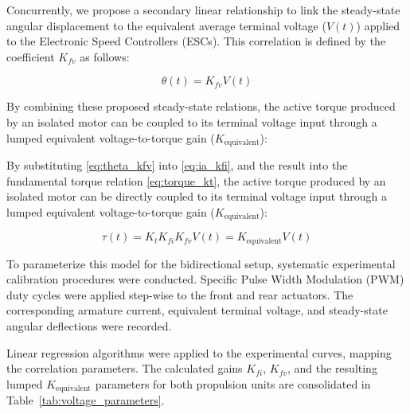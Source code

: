 \documentclass[pdflatex,sn-mathphys-num,iicol]{sn-jnl}
\theoremstyle{thmstyleone}%
\theoremstyle{thmstyletwo}%
\theoremstyle{thmstylethree}%
\begin{document}
Concurrently, we propose a secondary linear relationship to link the steady-state angular displacement to the equivalent average terminal voltage ($V(t)$) applied to the Electronic Speed Controllers (ESCs). This correlation is defined by the coefficient $K_{fv}$ as follows:

\begin{equation}
\theta(t) = K_{fv} V(t)
\label{eq:theta_kfv}
\end{equation}

By combining these proposed steady-state relations, the active torque produced by an isolated motor can be coupled to its terminal voltage input through a lumped equivalent voltage-to-torque gain ($K_{\text{equivalent}}$):

By substituting \eqref{eq:theta_kfv} into \eqref{eq:ia_kfi}, and the result into the fundamental torque relation \eqref{eq:torque_kt}, the active torque produced by an isolated motor can be directly coupled to its terminal voltage input through a lumped equivalent voltage-to-torque gain ($K_{\text{equivalent}}$):

\begin{equation}
\tau(t) = K_t K_{fi} K_{fv} V(t) = K_{\text{equivalent}} V(t)
\label{eq:torque_kequiv}
\end{equation}

To parameterize this model for the bidirectional setup, systematic experimental calibration procedures were conducted. Specific Pulse Width Modulation (PWM) duty cycles were applied step-wise to the front and rear actuators. The corresponding armature current, equivalent terminal voltage, and steady-state angular deflections were recorded. 

Linear regression algorithms were applied to the experimental curves, mapping the correlation parameters. The calculated gains $K_{fi}$, $K_{fv}$, and the resulting lumped $K_{\text{equivalent}}$ parameters for both propulsion units are consolidated in Table~\ref{tab:voltage_parameters}.
\end{document}
